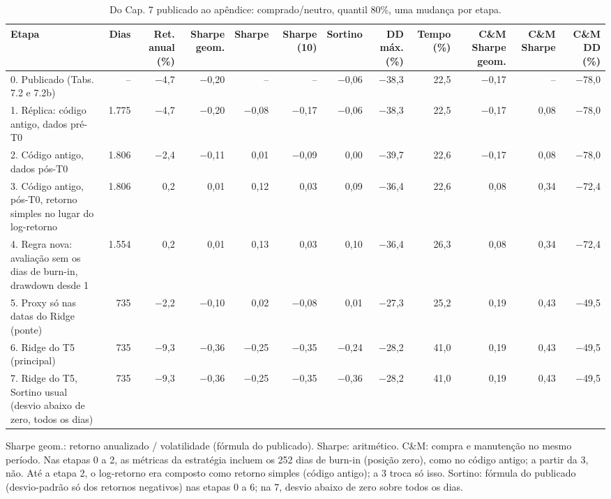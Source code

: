 \begin{table}[H]
\centering
\small
\caption{Do Cap. 7 publicado ao apêndice: comprado/neutro, quantil 80\%, uma mudança por etapa.}
\label{tab:A1-decomposicao}
\begin{tabular}{lrrrrrrrrrrr}
\toprule
Etapa & Dias & Ret. anual (\%) & Sharpe geom. & Sharpe & Sharpe (10) & Sortino & DD máx. (\%) & Tempo (\%) & C\&M Sharpe geom. & C\&M Sharpe & C\&M DD (\%) \\
\midrule
0. Publicado (Tabs. 7.2 e 7.2b) & -- & $-$4{,}7 & $-$0{,}20 & -- & -- & $-$0{,}06 & $-$38{,}3 & 22{,}5 & $-$0{,}17 & -- & $-$78{,}0 \\
1. Réplica: código antigo, dados pré-T0 & 1.775 & $-$4{,}7 & $-$0{,}20 & $-$0{,}08 & $-$0{,}17 & $-$0{,}06 & $-$38{,}3 & 22{,}5 & $-$0{,}17 & 0{,}08 & $-$78{,}0 \\
2. Código antigo, dados pós-T0 & 1.806 & $-$2{,}4 & $-$0{,}11 & 0{,}01 & $-$0{,}09 & 0{,}00 & $-$39{,}7 & 22{,}6 & $-$0{,}17 & 0{,}08 & $-$78{,}0 \\
3. Código antigo, pós-T0, retorno simples no lugar do log-retorno & 1.806 & 0{,}2 & 0{,}01 & 0{,}12 & 0{,}03 & 0{,}09 & $-$36{,}4 & 22{,}6 & 0{,}08 & 0{,}34 & $-$72{,}4 \\
4. Regra nova: avaliação sem os dias de burn-in, drawdown desde 1 & 1.554 & 0{,}2 & 0{,}01 & 0{,}13 & 0{,}03 & 0{,}10 & $-$36{,}4 & 26{,}3 & 0{,}08 & 0{,}34 & $-$72{,}4 \\
5. Proxy só nas datas do Ridge (ponte) & 735 & $-$2{,}2 & $-$0{,}10 & 0{,}02 & $-$0{,}08 & 0{,}01 & $-$27{,}3 & 25{,}2 & 0{,}19 & 0{,}43 & $-$49{,}5 \\
6. Ridge do T5 (principal) & 735 & $-$9{,}3 & $-$0{,}36 & $-$0{,}25 & $-$0{,}35 & $-$0{,}24 & $-$28{,}2 & 41{,}0 & 0{,}19 & 0{,}43 & $-$49{,}5 \\
7. Ridge do T5, Sortino usual (desvio abaixo de zero, todos os dias) & 735 & $-$9{,}3 & $-$0{,}36 & $-$0{,}25 & $-$0{,}35 & $-$0{,}36 & $-$28{,}2 & 41{,}0 & 0{,}19 & 0{,}43 & $-$49{,}5 \\
\bottomrule
\end{tabular}

\par\smallskip\parbox{\linewidth}{\footnotesize Sharpe geom.: retorno anualizado / volatilidade (fórmula do publicado). Sharpe: aritmético. C\&M: compra e manutenção no mesmo período. Nas etapas 0 a 2, as métricas da estratégia incluem os 252 dias de burn-in (posição zero), como no código antigo; a partir da 3, não. Até a etapa 2, o log-retorno era composto como retorno simples (código antigo); a 3 troca só isso. Sortino: fórmula do publicado (desvio-padrão só dos retornos negativos) nas etapas 0 a 6; na 7, desvio abaixo de zero sobre todos os dias.}
\end{table}
